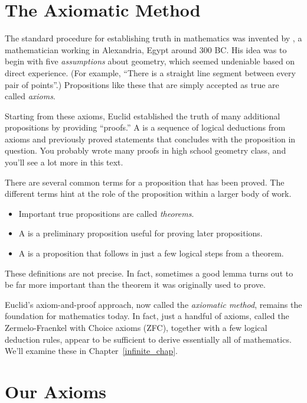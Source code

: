 \section{The Axiomatic Method}\label{axiom_method_sec}

The standard procedure for establishing truth in mathematics was
invented by , a mathematician working in Alexandria, Egypt
around 300 BC.  His idea was to begin with five \textit{assumptions}
about geometry, which seemed undeniable based on direct experience.
(For example, ``There is a straight line segment between every pair of
points''.)  Propositions like these that are simply accepted as true are
called %
% 
\emph{axioms}. 

Starting from these axioms, Euclid established the truth of many
additional propositions by providing ``proofs.''  A  is a
sequence of logical deductions from axioms and previously proved
statements that concludes with the proposition in question.  You
probably wrote many proofs in high school geometry class, and you'll
see a lot more in this text.

There are several common terms for a proposition that has been proved.
The different terms hint at the role of the proposition within a
larger body of work.
%
\begin{itemize}
\item Important true propositions are called \emph{theorems}.%
\item A  is a preliminary proposition useful for proving
later propositions.
\item A  is a proposition that follows
in just a few logical steps from a theorem.  
\end{itemize}
These definitions are not precise.  In fact, sometimes a good lemma
turns out to be far more important than the theorem it was originally
used to prove.

Euclid's axiom-and-proof approach, now called the \emph{axiomatic
  method},%
 remains the foundation for mathematics today.  In fact,
just a handful of axioms, called the Zermelo-Fraenkel with
Choice axioms (ZFC),%
together with a few logical deduction rules, appear to be 
sufficient to derive essentially all of
mathematics.  We'll examine these in Chapter~\ref{infinite_chap}.

\section{Our Axioms}

